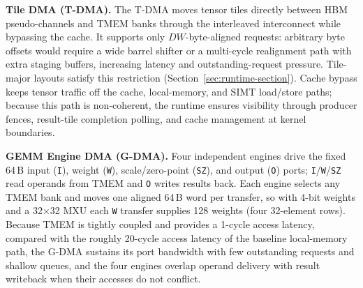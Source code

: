 \documentclass[sigconf,anonymous,nonacm]{acmart}
\newcommand{\ours}{\textsc{FINISH}}
\begin{document}
\textbf{Tile DMA (T-DMA).} The T-DMA moves tensor tiles directly between HBM pseudo-channels and TMEM banks through the interleaved interconnect while bypassing the cache. It supports only $DW$-byte-aligned requests: arbitrary byte offsets would require a wide barrel shifter or a multi-cycle realignment path with extra staging buffers, increasing latency and outstanding-request pressure. Tile-major layouts satisfy this restriction (Section~\ref{sec:runtime-section}). Cache bypass keeps tensor traffic off the cache, local-memory, and SIMT load/store paths; because this path is non-coherent, the runtime ensures visibility through producer fences, result-tile completion polling, and cache management at kernel boundaries.

\textbf{GEMM Engine DMA (G-DMA).} Four independent engines drive the fixed 64\,B input (\texttt{I}), weight (\texttt{W}), scale/zero-point (\texttt{SZ}), and output (\texttt{O}) ports; \texttt{I}/\texttt{W}/\texttt{SZ} read operands from TMEM and \texttt{O} writes results back. Each engine selects any TMEM bank and moves one aligned 64\,B word per transfer, so with 4-bit weights and a 32$\times$32 MXU each \texttt{W} transfer supplies 128 weights (four 32-element rows). Because TMEM is tightly coupled and provides a 1-cycle access latency, compared with the roughly 20-cycle access latency of the baseline local-memory path, the G-DMA sustains its port bandwidth with few outstanding requests and shallow queues, and the four engines overlap operand delivery with result writeback when their accesses do not conflict.


\end{document}
